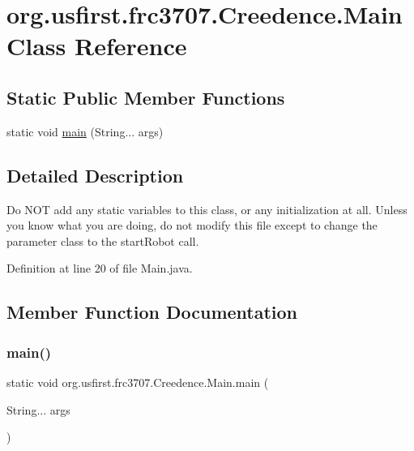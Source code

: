 \hypertarget{classorg_1_1usfirst_1_1frc3707_1_1_creedence_1_1_main}{}\section{org.\+usfirst.\+frc3707.\+Creedence.\+Main Class Reference}
\label{classorg_1_1usfirst_1_1frc3707_1_1_creedence_1_1_main}
\subsection*{Static Public Member Functions}
\begin{DoxyCompactItemize}
\item 
static void \mbox{\hyperlink{classorg_1_1usfirst_1_1frc3707_1_1_creedence_1_1_main_a4bd105222c75d1ea986397230d184b21}{main}} (String... args)
\end{DoxyCompactItemize}


\subsection{Detailed Description}
Do N\+OT add any static variables to this class, or any initialization at all. Unless you know what you are doing, do not modify this file except to change the parameter class to the start\+Robot call. 

Definition at line 20 of file Main.\+java.



\subsection{Member Function Documentation}
\mbox{\label{classorg_1_1usfirst_1_1frc3707_1_1_creedence_1_1_main_a4bd105222c75d1ea986397230d184b21}} 
\subsubsection{\texorpdfstring{main()}{main()}}
{\footnotesize\ttfamily static void org.\+usfirst.\+frc3707.\+Creedence.\+Main.\+main (\begin{DoxyParamCaption}\item[{String...}]{args }\end{DoxyParamCaption})\hspace{0.3cm}{\ttfamily [static]}}

